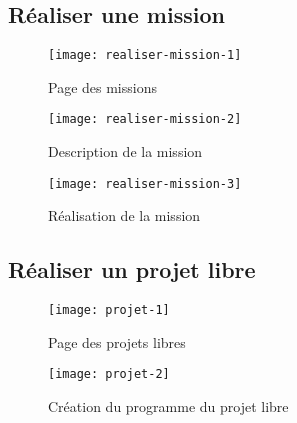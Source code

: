 \FloatBarrier
\subsection{Réaliser une mission}
\begin{figure}[H]
  \begin{center}
    \texttt{[image: realiser-mission-1]}
    \caption{Page des missions}
    \label{fig:realiser-mission-1}
  \end{center}
\end{figure}
\begin{figure}[H]
  \begin{center}
    \texttt{[image: realiser-mission-2]}
    \caption{Description de la mission}
    \label{fig:realiser-mission-2}
  \end{center}
\end{figure}
\begin{figure}[H]
  \begin{center}
    \texttt{[image: realiser-mission-3]}
    \caption{Réalisation de la mission}
    \label{fig:realiser-mission-3}
  \end{center}
\end{figure}

\FloatBarrier
\subsection{Réaliser un projet libre}
\begin{figure}[H]
  \begin{center}
    \texttt{[image: projet-1]}
    \caption{Page des projets libres}
    \label{fig:projet-1}
  \end{center}
\end{figure}
\begin{figure}[H]
  \begin{center}
    \texttt{[image: projet-2]}
    \caption{Création du programme du projet libre}
    \label{fig:projet-2}
  \end{center}
\end{figure}

\FloatBarrier
